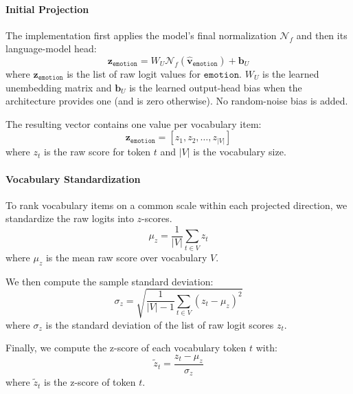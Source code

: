 \paragraph{Initial Projection} The implementation first applies the model's final normalization $\mathcal{N}_f$ and then its language-model head:
\begin{equation}
    \mathbf{z}_{\mathtt{emotion}}=W_U\mathcal{N}_f\!\left(\mathbf{\hat{v}}_{\mathtt{emotion}}\right)+\mathbf{b}_U
    \label{eqtn:initial-projection}
\end{equation}
where $\mathbf{z}_{\mathtt{emotion}}$ is the list of raw logit values for $\mathtt{emotion}$. $W_U$ 
is the learned unembedding matrix and $\mathbf{b}_U$ is the learned output-head bias when the architecture provides one (and is zero otherwise). 
No random-noise bias is added.

The resulting vector contains one value per vocabulary item:
\begin{equation}
    \mathbf{z}_{\mathtt{emotion}}=[z_1,z_2,\dots,z_{|V|}]
    \label{eqtn:logits-set}
\end{equation}
where $z_t$ is the raw score for token $t$ and $|V|$ is the vocabulary size.

\paragraph{Vocabulary Standardization} To rank vocabulary items on a common scale within each projected direction, we standardize the raw 
logits into $z$-scores.
\begin{equation}
    \mu_z=\frac{1}{|V|}\sum_{t\in V}^{} z_t
    \label{eqtn:mean-logits}
\end{equation}
where $\mu_z$ is the mean raw score over vocabulary $V$.

We then compute the sample standard deviation:
\begin{equation}
    \sigma_z=\sqrt{\frac{1}{|V|-1}\sum_{t\in V}^{}\left(z_t-\mu_z\right)^2}
    \label{eqtn:stddev-logits}
\end{equation}
where $\sigma_z$ is the standard deviation of the list of raw logit scores $z_t$.

Finally, we compute the z-score of each vocabulary token $t$ with:
\begin{equation}
    \tilde{z}_t=\frac{z_t-\mu_z}{\sigma_z}
    \label{eqtn:bell-logits}
\end{equation}
where $\tilde{z}_t$ is the z-score of token $t$.

